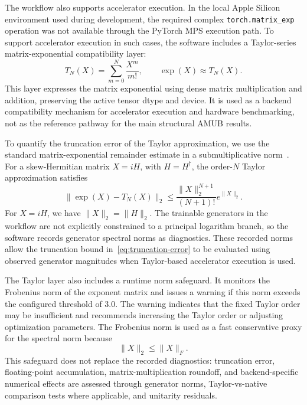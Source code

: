 \documentclass[a4paper,twocolumn,11pt,amsfonts,amssymb]{quantumarticle}
\begin{document}
The workflow also supports accelerator execution. In the local Apple Silicon environment used during development, the required complex \texttt{torch.matrix\_exp} operation was not available through the PyTorch MPS execution path. To support accelerator execution in such cases, the software includes a Taylor-series matrix-exponential compatibility layer:
\begin{equation}
    T_N(X) = \sum_{m=0}^{N} \frac{X^m}{m!},
    \qquad
    \exp(X) \approx T_N(X).
    \label{eq:taylor-matrix-exp}
\end{equation}
This layer expresses the matrix exponential using dense matrix multiplication and addition, preserving the active tensor dtype and device. It is used as a backend compatibility mechanism for accelerator execution and hardware benchmarking, not as the reference pathway for the main structural AMUB results.

To quantify the truncation error of the Taylor approximation, we use the standard matrix-exponential remainder estimate in a submultiplicative norm~\cite{Higham2008FunctionsMatrix}. For a skew-Hermitian matrix \(X=iH\), with \(H=H^\dagger\), the order-\(N\) Taylor approximation satisfies
\begin{equation}
    \| \exp(X) - T_N(X) \|_2
    \le
    \frac{\|X\|_2^{N+1}}{(N+1)!} e^{\|X\|_2}.
    \label{eq:truncation-error}
\end{equation}
For \(X=iH\), we have \(\|X\|_2=\|H\|_2\). The trainable generators in the workflow are not explicitly constrained to a principal logarithm branch, so the software records generator spectral norms as diagnostics. These recorded norms allow the truncation bound in~\eqref{eq:truncation-error} to be evaluated using observed generator magnitudes when Taylor-based accelerator execution is used.

The Taylor layer also includes a runtime norm safeguard. It monitors the Frobenius norm of the exponent matrix and issues a warning if this norm exceeds the configured threshold of \(3.0\). The warning indicates that the fixed Taylor order may be insufficient and recommends increasing the Taylor order or adjusting optimization parameters. The Frobenius norm is used as a fast conservative proxy for the spectral norm because
\[
    \|X\|_2 \leq \|X\|_F .
\]
This safeguard does not replace the recorded diagnostics: truncation error, floating-point accumulation, matrix-multiplication roundoff, and backend-specific numerical effects are assessed through generator norms, Taylor-vs-native comparison tests where applicable, and unitarity residuals.
\end{document}

